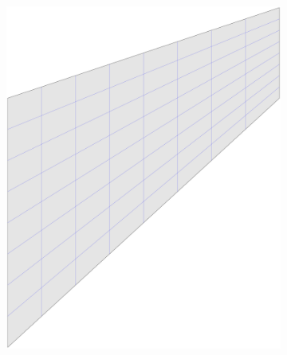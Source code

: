 \begin{figure}[htb!]
\begin{subfigure}[b]{0.18\linewidth}
    \end{subfigure}
    \begin{subfigure}[b]{0.18\linewidth}        %
        \centering
        \includegraphics[width=\linewidth]{mesh_cook_3}
    \end{subfigure}
    \begin{subfigure}[b]{0.18\linewidth}        %
        \centering

\end{subfigure}
\end{figure}
